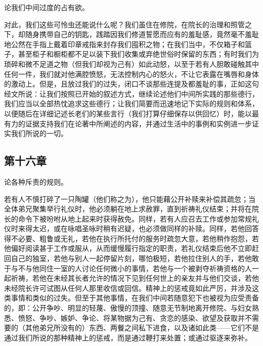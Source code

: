 论我们中间过度的占有欲。\par

对此，我们这些可怜虫还能说什么呢？我们虽住在修院，在院长的治理和照管之下，却随身携带自己的钥匙，践踏因我们修道誓愿而应有的羞耻感，竟然毫不羞耻地公然在手指上戴着印章戒指来封存我们囤积之物；在我们当中，不仅箱子和篮子，甚至柜子和橱柜都不足以装下我们收集或弃绝世俗时保留的东西；有时我们为琐碎和微不足道之物（但我们却视为己有）如此动怒，以至于若有人胆敢碰触其中任何一件，我们就对他满腔愤怒，无法控制内心的怒火，不让它表露在嘴唇和身体的激动上。但是，且放过我们的过失，闭口不谈那些连提及都羞耻的事，正如这句经文所说：让我们按照已开始的叙述方式，继续论述他们中间所实践的那些德行，我们应当以全部热忱追求这些德行；让我们简要而迅速地记下实际的规则和体系，以便随后在详细记述长老们的某些言行（我们打算仔细保存以供回忆）时，能以最有力的证据支持我们在论著中所阐述的内容，并通过生活中的事例和实例进一步证实我们所说的一切。\par


\subsection{第十六章}

论各种斥责的规则。\par

若有人不慎打碎了一只陶罐（他们称之为），他只能藉公开补赎来补偿其疏忽；当全体弟兄聚集举行礼仪时，他必须躺在地上求赦罪，直到祈祷礼仪结束；并将在院长的命令下被吩咐从地上起来时获得赦免。同样，若有人应召去工作或参加常规礼仪时来得太迟，或在咏唱圣咏时稍有迟疑，也必须做同样的补赎。同样，若他回答得不必要、粗鲁或无礼，若他在执行所托付的服务时疏忽大意，若他稍作抱怨，若他偏好阅读甚于工作或服从，从而缓慢履行指定的职责，若礼仪结束后他不立即赶回自己的独室，若他与别人一起停留片刻，哪怕极短，若他拉住别人的手，若他敢于与不与他同住一室的人讨论任何微小的事情，若他与一个被剥夺祈祷资格的人一起祈祷，若他在未经其长者允许的情况下见到任何世上的亲友并与他们交谈，若他未经院长许可试图从任何人那里收信或回信。精神上的惩戒竟如此严厉，并涉及这类事情和类似的过失。但至于其他事情，在我们中间若随意犯下也被视为应受责备的，即：公开争吵、明显的轻蔑、傲慢的顶撞、随意无节制地离开修院、与妇女熟悉、愤怒、争吵、嫉妒、争论、将某物据为己有、贪恋的感染、欲望及获取并不需要的（其他弟兄所没有的）东西、两餐之间私下进食，以及诸如此类——它们不是通过我们所说的那种精神上的惩戒，而是通过鞭打来处置；或通过驱逐来弥补。\par

